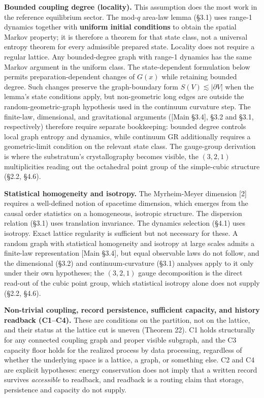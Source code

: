 \documentclass[
]{article}
\begin{document}
\textbf{Bounded coupling degree (locality).} This assumption does the
most work in the reference equilibrium sector. The mod-\(q\) area-law
lemma (§3.1) uses range-1 dynamics together with \textbf{uniform initial
conditions} to obtain the spatial Markov property; it is therefore a
theorem for that state class, not a universal entropy theorem for every
admissible prepared state. Locality does not require a regular lattice.
Any bounded-degree graph with range-1 dynamics has the same Markov
argument in the uniform class. The state-dependent formulation below
permits preparation-dependent changes of \(G(x)\) while retaining
bounded degree. Such changes preserve the graph-boundary form
\(S(V)\lesssim |\partial V|\) when the lemma's state conditions apply,
but non-geometric long edges are outside the random-geometric-graph
hypothesis used in the continuum curvature step. The finite-law,
dimensional, and gravitational arguments ({[}Main §3.4{]}, §3.2 and
§3.1, respectively) therefore require separate bookkeeping: bounded
degree controls local graph entropy and dynamics, while continuum GR
additionally requires a geometric-limit condition on the relevant state
class. The gauge-group derivation is where the substratum's
crystallography becomes visible, the \((3,2,1)\) multiplicities reading
out the octahedral point group of the simple-cubic structure (§2.2,
§4.6).

\textbf{Statistical homogeneity and isotropy.} The Myrheim-Meyer
dimension {[}2{]} requires a well-defined notion of spacetime dimension,
which emerges from the causal order statistics on a homogeneous,
isotropic structure. The dispersion relation (§3.1) uses translation
invariance. The dynamics selection (§4.1) uses isotropy. Exact lattice
regularity is sufficient but not necessary for these. A random graph
with statistical homogeneity and isotropy at large scales admits a
finite-law representation {[}Main §3.4{]}, but equal observable laws do
not follow, and the dimensional (§3.2) and continuum-curvature (§3.1)
analyses apply to it only under their own hypotheses; the \((3,2,1)\)
gauge decomposition is the direct read-out of the cubic point group,
which statistical isotropy alone does not supply (§2.2, §4.6).

\textbf{Non-trivial coupling, record persistence, sufficient capacity,
and history readback (C1--C4).} These are conditions on the partition,
not on the lattice, and their status at the lattice cut is uneven
(Theorem 22). C1 holds structurally for any connected coupling graph and
proper visible subgraph, and the C3 capacity floor holds for the
realized process by data processing, regardless of whether the
underlying space is a lattice, a graph, or something else. C2 and C4 are
explicit hypotheses: energy conservation does not imply that a written
record survives \emph{accessible} to readback, and readback is a routing
claim that storage, persistence and capacity do not supply.
\end{document}
